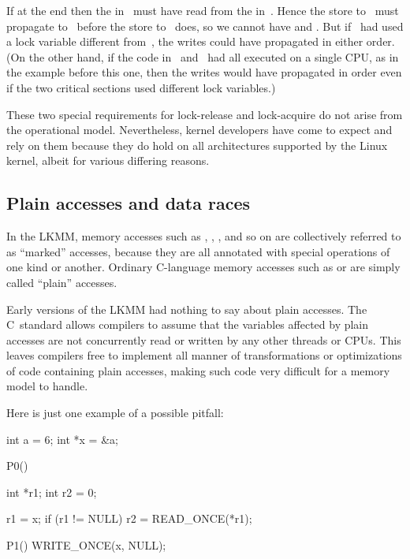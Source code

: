 If  at the end then the  in~ must
have read from
the  in~.
Hence the store to~ must propagate to~
before the store to~ does, so we cannot have  and
.
But
if ~had used a lock variable different from~, the writes could have
propagated in either order.
(On the other hand, if the code in~ and~
had all executed on a single CPU, as in the example before this
one, then the writes would have propagated in order even if the two
critical sections used different lock variables.)

These two special requirements for lock-release and lock-acquire do
not arise from the operational model.
Nevertheless, kernel developers
have come to expect and rely on them because they do hold on all
architectures supported by the Linux kernel, albeit for various
differing reasons.


\subsection{Plain accesses and data races}
\label{sec:docs:explanation:Plain accesses and data races}

In the LKMM, memory accesses such as , ,
, and so on are collectively referred to as
``marked'' accesses, because they are all annotated with special
operations of one kind or another.
Ordinary C-language memory
accesses such as  or  are simply called ``plain'' accesses.

Early versions of the LKMM had nothing to say about plain accesses.
The C~standard allows compilers to assume that the variables affected
by plain accesses are not concurrently read or written by any other
threads or CPUs.
This leaves compilers free to implement all manner
of transformations or optimizations of code containing plain accesses,
making such code very difficult for a memory model to handle.

Here is just one example of a possible pitfall:

\begin{VerbatimU}
	int a = 6;
	int *x = &a;

	P0()
	{
		int *r1;
		int r2 = 0;

		r1 = x;
		if (r1 != NULL)
			r2 = READ_ONCE(*r1);
	}

	P1()
	{
		WRITE_ONCE(x, NULL);
	}
\end{VerbatimU}

